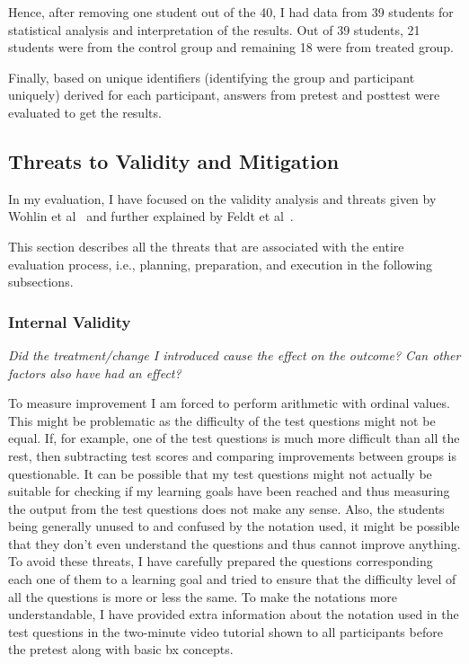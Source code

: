 Hence, after removing one student out of the 40, I had data from 39 students for statistical analysis and interpretation of the results. Out of 39 students, 21 students were from the control group and remaining 18 were from treated group.

Finally, based on unique identifiers (identifying the group and participant uniquely) derived for each participant, answers from pretest and posttest were evaluated to get the results. 

\subsection{Threats to Validity and Mitigation}\label{subsec:threats&mitigation}
In my evaluation, I have focused on the validity analysis and threats given by Wohlin et al~\cite{expinse} and further explained by Feldt et al~\cite{validitythreatsinse}. 

This section describes all the threats that are associated with the entire evaluation process, i.e., planning, preparation, and execution in the following subsections.
 
\subsubsection{Internal Validity}\label{subsubsec:internalvalidity}
\emph{Did the treatment/change I introduced cause the effect on the outcome? Can other factors also have had an effect?}

\medskip
\noindent To measure improvement I am forced to perform arithmetic with ordinal values.
This might be problematic as the difficulty of the test questions might not be equal. If, for example, one of the test questions is much more difficult than all the rest, then subtracting test scores and comparing improvements between groups is questionable. It can be possible that my test questions might not actually be suitable for checking if my learning goals have been reached and thus measuring the output from the test questions does not make any sense. Also, the students being generally unused to and confused by the notation used, it might be possible that they don't even understand the questions and thus cannot improve anything. To avoid these threats, I have carefully prepared the questions corresponding each one of them to a learning goal and tried to ensure that the difficulty level of all the questions is more or less the same. To make the notations more understandable, I have provided extra information about the notation used in the test questions in the two-minute video tutorial shown to all participants before the pretest along with basic bx concepts.

